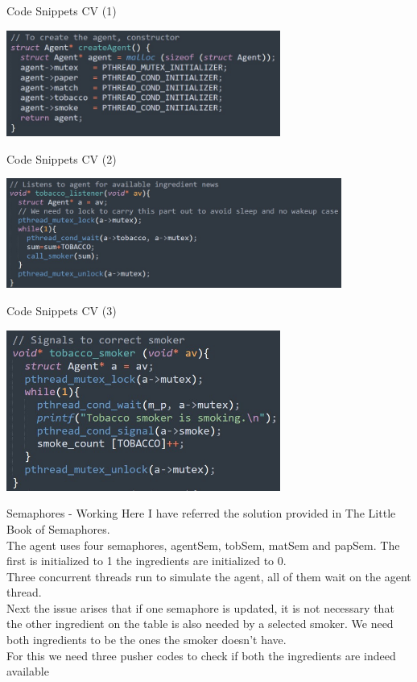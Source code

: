 \documentclass[dvipsnames]{beamer}
\theoremstyle{definition}
\begin{document}
\begin{frame}{Code Snippets CV (1)}
\begin{center}
    \includegraphics[width=9cm]{cs1.jpg}
\end{center}
\end{frame}
\begin{frame}{Code Snippets CV (2)}
\begin{center}
    \includegraphics[width=11cm]{cs2.jpg}
\end{center}
\end{frame}
\begin{frame}{Code Snippets CV (3)}
\begin{center}
    \includegraphics[width=9cm]{cs3.jpg}
\end{center}
\end{frame}

\begin{frame}{Semaphores - Working}
Here I have referred the solution provided in The Little Book of Semaphores. \\
The agent uses four semaphores, agentSem, tobSem, matSem and papSem. The first is initialized to 1 the ingredients are initialized to 0. \\
Three concurrent threads run to simulate the agent, all of them wait on the agent thread. \\
Next the issue arises that if one semaphore is updated, it is not necessary that the other ingredient on the table is also needed by a selected smoker. We need both ingredients to be the ones the smoker doesn't have. \\
For this we need three pusher codes to check if both the ingredients are indeed available
\end{frame}
\end{document}
